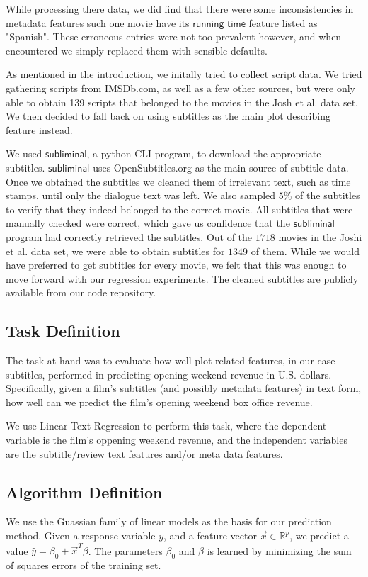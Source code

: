 \documentclass[11pt]{article}
\begin{document}
While processing there data, we 
did find that there were some inconsistencies in metadata features such one movie
have its $\mathsf{running\_time}$ feature listed as "Spanish". These erroneous entries
were not too prevalent however, and when encountered we simply replaced them with
sensible defaults.

As mentioned in the introduction, we initally tried to collect script data. We tried
gathering scripts from IMSDb.com, as well as a few other sources, but were only able
to obtain 139 scripts that belonged to the movies in the Josh et al. data set. We then
decided to fall back on using subtitles as the main plot describing feature instead.

We used $\mathsf{subliminal}$, a python CLI program, to download the appropriate
subtitles. $\mathsf{subliminal}$ uses OpenSubtitles.org as the main source of subtitle
data. Once we obtained the subtitles we cleaned them of irrelevant text, such as time
stamps, until only the dialogue text was left. We also sampled $5$\% of the subtitles to
verify that they indeed belonged to the correct movie. All subtitles that were manually
checked were correct, which gave us confidence that the $\mathsf{subliminal}$ program
had correctly retrieved the subtitles. Out of the $1718$ movies in the Joshi
et al. data set, we were able to obtain subtitles for $1349$ of them.
While we would have preferred to get subtitles for every movie, we felt that this was
enough to move forward with our regression experiments. The cleaned subtitles are
publicly available from our code repository.

\subsection{Task Definition}
The task at hand was to evaluate how well plot related features, in our case subtitles,
performed in predicting opening weekend revenue in U.S. dollars. Specifically, given
a film's subtitles (and possibly metadata features) in text form, how well can we
predict the film's opening weekend box office revenue.

We use Linear Text Regression to perform this task, where the dependent variable is
the film's oppening weekend revenue, and the independent variables are the subtitle/review
text features and/or meta data features.

\subsection{Algorithm Definition}
We use the Guassian family of linear models as the basis for our prediction method.
Given a response variable $y$, and a feature vector $\vec{x} \in \mathbb{R}^p$, we
predict a value $\hat{y} = \beta_0 + \vec{x}^T \beta$. The parameters $\beta_0$ and $\beta$
is learned by minimizing the sum of squares errors of the training set.
\end{document}
